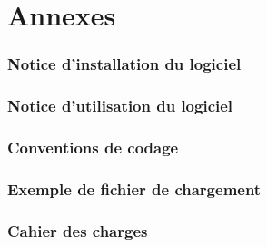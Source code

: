 \documentclass[paper=a4, fontsize=12pt]{article}
\newenvironment{changemargin}[2]{\begin{list}{}{%
      \setlength{\topsep}{0pt}%
      \setlength{\leftmargin}{0pt}%
      \setlength{\rightmargin}{0pt}%
      \setlength{\listparindent}{\parindent}%
      \setlength{\itemindent}{\parindent}%
      \setlength{\parsep}{0pt plus 1pt}%
      \addtolength{\leftmargin}{#1}%
      \addtolength{\rightmargin}{#2}%
    }\item }{\end{list}}
\numberwithin{equation}{section}		%
\numberwithin{figure}{section}			%
\numberwithin{table}{section}				%
\begin{document}
\begin{changemargin}{-1cm}{-1cm}
  
  

  \appendix
  \part*{Annexes}
  \section{Notice d'installation du logiciel}%
  \newpage 
  \section{Notice d'utilisation du logiciel}%
   
  \newpage
  \section{Conventions de codage}%
  \newpage 
  \section{Exemple de fichier de chargement}
    
  \newpage
  \section{Cahier des charges}
    
  \newpage
  

  


\end{changemargin}

\end{document}
